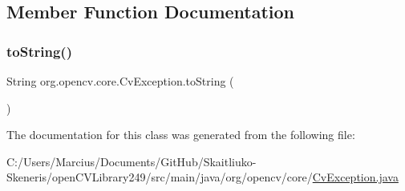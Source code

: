 \subsection{Member Function Documentation}
\mbox{\label{classorg_1_1opencv_1_1core_1_1_cv_exception_a62e6bc507d9605178a834087a03438d6}} 
\subsubsection{\texorpdfstring{to\+String()}{toString()}}
{\footnotesize\ttfamily String org.\+opencv.\+core.\+Cv\+Exception.\+to\+String (\begin{DoxyParamCaption}{ }\end{DoxyParamCaption})}



The documentation for this class was generated from the following file\+:\begin{DoxyCompactItemize}
\item 
C\+:/\+Users/\+Marcius/\+Documents/\+Git\+Hub/\+Skaitliuko-\/\+Skeneris/open\+C\+V\+Library249/src/main/java/org/opencv/core/\mbox{\hyperlink{_cv_exception_8java}{Cv\+Exception.\+java}}\end{DoxyCompactItemize}
